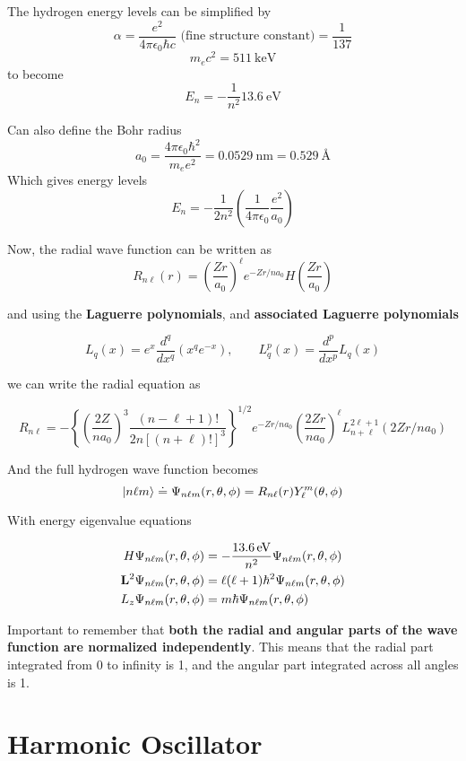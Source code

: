 \documentclass{article}
\begin{document}
The hydrogen energy levels can be simplified by 
$$
\alpha = \frac{e^2}{4\pi \epsilon_0 \hbar c} \text{ (fine structure constant)} = \frac{1}{137}
$$
$$
m_e c^2 = \SI{511}{\kilo \eV}
$$
to become 
$$
E_n = -\frac{1}{n^2} \SI{13.6}{\eV}
$$

Can also define the Bohr radius
$$
a_0 = \frac{4\pi \epsilon_0 \hbar^2}{m_e e^2} = \SI{0.0529}{\nano \m} = \SI{0.529}{\angstrom}
$$
Which gives energy levels
$$
E_n = -\frac{1}{2n^2}\left( \frac{1}{4\pi\epsilon_0} \frac{e^2}{a_0} \right)
$$

Now, the radial wave function can be written as
$$
R_{n\ell}(r) = \left( \frac{Zr}{a_0}\right)^{\ell} e^{-Zr / n a_0}H\left( \frac{Zr}{a_0}\right)
$$

and using the \textbf{Laguerre polynomials}, and \textbf{associated Laguerre polynomials}

$$
L_q(x) = e^x \frac{d^q}{dx^q} (x^q e^{-x}), \qquad L^{p}_q(x) = \frac{d^p}{dx^p}L_q(x)
$$

we can write the radial equation as

$$
R_{n\ell} = - \left\{ \left( \frac{2Z}{na_0} \right)^3 \frac{(n-\ell + 1)!}{2n [(n+\ell)!]^3} \right\}^{1/2} e^{-Zr/na_0} \left( \frac{2Zr}{na_0} \right)^\ell L_{n+\ell}^{2\ell+1}(2Zr/na_0)
$$

And the full hydrogen wave function becomes
$$
\ket{n\ell m} \doteq \Psi_{n\ell m}(r,\theta,\phi) = R_{n\ell}(r)Y^m_\ell(\theta,\phi)
$$

With energy eigenvalue equations
\begin{center}
    \begin{align*}
        H\Psi_{n\ell m}(r,\theta,\phi) & = -\frac{\SI{13.6}{\eV}}{n^2}\Psi_{n\ell m}(r,\theta,\phi) \\
        \vb{L}^2 \Psi_{n\ell m}(r,\theta,\phi) & = \ell(\ell+1)\hbar^2 \Psi_{n\ell m}(r,\theta,\phi) \\
        L_z\Psi_{n\ell m}(r,\theta,\phi) & = m \hbar\Psi_{n\ell m}(r,\theta,\phi)
    \end{align*}
\end{center}

Important to remember that \textbf{both the radial and angular parts of the wave function are normalized independently}.  This means that the radial part integrated from 0 to infinity is 1, and the angular part integrated across all angles is 1.


\section{Harmonic Oscillator}
\end{document}
